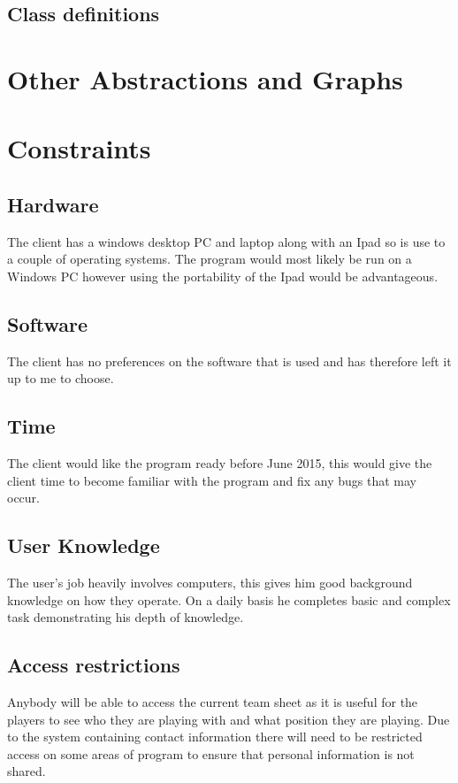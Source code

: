\subsection{Class definitions}

\section{Other Abstractions and Graphs}

\section{Constraints}

\subsection{Hardware}
The client has a windows desktop PC and laptop along with an Ipad so is use to a couple of operating systems. The program would most likely be run on a Windows PC however using the portability of the Ipad would be advantageous.
\subsection{Software}
The client has no preferences on the software that is used and has therefore left it up to me to choose.  
\subsection{Time}
The client would like the program ready before June 2015, this would give the client time to become familiar with the program and fix any bugs that may occur. 
\subsection{User Knowledge}
The user's job heavily involves computers, this gives him good background knowledge on how they operate. On a daily basis he completes basic and complex task demonstrating his depth of knowledge. 
\subsection{Access restrictions}
Anybody will be able to access the current team sheet as it is useful for the players to see who they are playing with and what position they are playing. Due to the system containing contact information there will need to be restricted access on some areas of program to ensure that personal information is not shared.   

